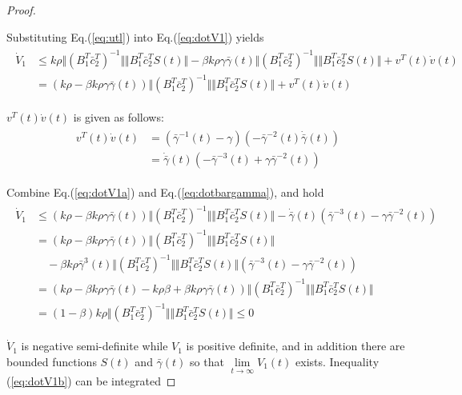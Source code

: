 \documentclass[3p]{elsarticle}
\theoremstyle{plain}
\begin{document}
\begin{proof}
\begin{equation}
\end{equation}\par
Substituting Eq.(\ref{eq:utl}) into Eq.(\ref{eq:dotV1}) yields
\begin{align}
\begin{split}
\dot{V}_1 &\le k\rho\Vert(B_1^T\bar{c}^T_2)^{-1}\Vert \Vert B^T_1\bar{c}_2^TS(t)\Vert - \beta k \rho \gamma \bar{\gamma}(t)\Vert(B_1^T\bar{c}^T_2)^{-1}\Vert \Vert B^T_1\bar{c}_2^TS(t)\Vert + v^T(t)\dot{v}(t)\\
&=(k\rho - \beta k \rho \gamma \bar{\gamma}(t))\Vert(B_1^T\bar{c}^T_2)^{-1}\Vert \Vert B^T_1\bar{c}_2^TS(t)\Vert + v^T(t)\dot{v}(t)\label{eq:dotV1a}
\end{split}
\end{align}\par
$v^T(t)\dot{v}(t)$ is given as follows:
\begin{align}
\begin{split}
v^T(t)\dot{v}(t) &= (\bar{\gamma}^{-1}(t) - \gamma)(-\bar{\gamma}^{-2}(t)\dot{\bar{\gamma}}(t))\\
&= \dot{\bar{\gamma}}(t)(-\bar{\gamma}^{-3}(t)+\gamma\bar{\gamma}^{-2}(t))\label{eq:dotbargamma}
\end{split}
\end{align}\par
Combine Eq.(\ref{eq:dotV1a}) and Eq.(\ref{eq:dotbargamma}), and hold
\begin{align}
\begin{split}
\dot{V}_1 &\le (k\rho - \beta k \rho \gamma \bar{\gamma}(t))\Vert(B_1^T\bar{c}^T_2)^{-1}\Vert \Vert B^T_1\bar{c}_2^TS(t)\Vert - \dot{\bar{\gamma}}(t)(\bar{\gamma}^{-3}(t)-\gamma\bar{\gamma}^{-2}(t))\\
&= (k\rho - \beta k \rho \gamma \bar{\gamma}(t))\Vert(B_1^T\bar{c}^T_2)^{-1}\Vert \Vert B^T_1\bar{c}_2^TS(t)\Vert\\
&\quad -\beta k \rho \bar{\gamma}^3(t)\Vert(B_1^T\bar{c}_2^T)^{-1}\Vert\Vert B_1^T\bar{c}_2^TS(t)\Vert(\bar{\gamma}^{-3}(t)-\gamma\bar{\gamma}^{-2}(t))\\
&= (k\rho - \beta k \rho \gamma \bar{\gamma}(t)-k\rho\beta+\beta k \rho \gamma \bar{\gamma}(t))\Vert(B_1^T\bar{c}^T_2)^{-1}\Vert \Vert B^T_1\bar{c}_2^TS(t)\Vert\\
&= (1 -\beta)k\rho\Vert(B_1^T\bar{c}^T_2)^{-1}\Vert \Vert B^T_1\bar{c}_2^TS(t)\Vert\le 0\label{eq:dotV1b}
\end{split}
\end{align}\par
$\dot{V}_1$ is negative semi-definite while $V_1$ is positive definite, and in addition there are bounded functions $S(t)$ and $\bar{\gamma}(t)$ so that $\lim\limits_{t\to\infty}V_1(t)$ exists. Inequality (\ref{eq:dotV1b}) can be integrated

\end{proof}
\end{document}
